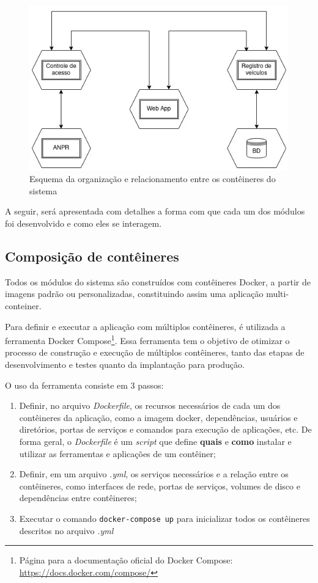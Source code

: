 \documentclass[12pt]{article}
\begin{document}
\begin{figure}[ht]
	\centering
	\includegraphics[width=.8\textwidth]{anpr-auth.jpg}
	\caption{Esquema da organização e relacionamento entre os contêineres do sistema}
	\label{fig:anpr-auth}
\end{figure}

A seguir, será apresentada com detalhes a forma com que cada um dos módulos foi desenvolvido e como eles se interagem.

\subsection{Composição de contêineres}

Todos os módulos do sistema são construídos com contêineres Docker, a partir de imagens padrão ou personalizadas, constituindo assim uma aplicação multi-conteiner.

Para definir e executar a aplicação com múltiplos contêineres, é utilizada a ferramenta Docker Compose\footnote{Página para a documentação oficial do Docker Compose: \url{https://docs.docker.com/compose/}}. Essa ferramenta tem o objetivo de otimizar o processo de construção e execução de múltiplos contêineres, tanto das etapas de desenvolvimento e testes quanto da implantação para produção.

O uso da ferramenta consiste em 3 passos:

\begin{enumerate}
	\item Definir, no arquivo \textit{Dockerfile}, os recursos necessários de cada um dos contêineres da aplicação, como a imagem docker, dependências, usuários e diretórios, portas de serviços e comandos para execução de aplicações, etc. De forma geral, o \textit{Dockerfile} é um \textit{script} que define \textbf{quais} e \textbf{como} instalar e utilizar as ferramentas e aplicações de um contêiner;
	\item Definir, em um arquivo \textit{.yml}, os serviços necessários e a relação entre os contêineres, como interfaces de rede, portas de serviços, volumes de disco e dependências entre contêineres;
	\item Executar o comando \texttt{docker-compose up} para inicializar todos os contêineres descritos no arquivo \textit{.yml}
\end{enumerate}
\end{document}
